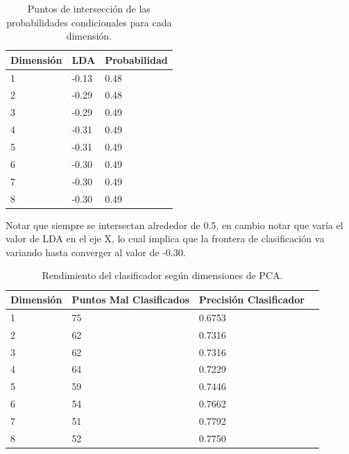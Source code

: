 \documentclass[letter, titlepage, 10pt]{article}
\begin{document}
\begin{table}[H]
\begin{center}
\begin{tabular}{|l|l|l|}
\hline
\textbf{Dimensión} & \textbf{LDA} & \textbf{Probabilidad}  \\ \hline
1                & -0.13     & 0.48    \\ \hline
2                & -0.29     & 0.48    \\ \hline
3                & -0.29     & 0.49    \\ \hline
4                & -0.31     & 0.49      \\ \hline
5                & -0.31     & 0.49      \\ \hline
6                & -0.30     & 0.49      \\ \hline
7                & -0.30     & 0.49      \\ \hline
8                & -0.30     & 0.49      \\ \hline
\end{tabular}
\caption{Puntos de intersección de las probabilidades condicionales para cada dimensión.}
\end{center}
\end{table}
Notar que siempre se intersectan alrededor de 0.5, en cambio notar que varía el valor de LDA en el eje X, lo cual implica que la frontera de clasificación va variando hasta converger al valor de -0.30.


\begin{table}[H]
\begin{center}
\begin{tabular}{|l|l|l|l|}
\hline
\textbf{Dimensión} & \textbf{Puntos Mal Clasificados} & \textbf{Precisión Clasificador} \\ \hline
1                & 75 & 0.6753      \\ \hline
2                & 62 & 0.7316      \\ \hline
3                & 62 & 0.7316      \\ \hline
4                & 64 & 0.7229      \\ \hline
5                & 59 & 0.7446      \\ \hline
6                & 54 & 0.7662      \\ \hline
7                & 51 & 0.7792      \\ \hline
8                & 52 & 0.7750      \\ \hline
\end{tabular}
\caption{Rendimiento del clasificador según dimensiones de PCA.}
\end{center}
\end{table}
\end{document}
